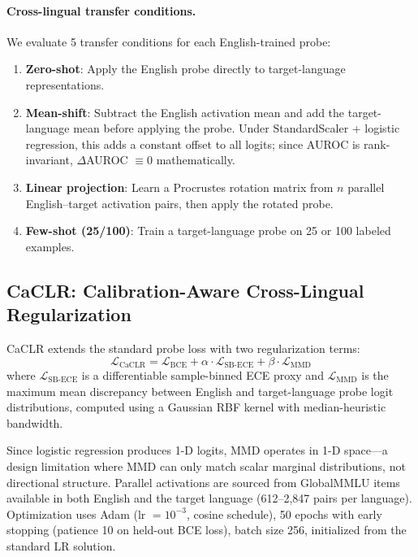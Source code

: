 \documentclass[11pt,a4paper]{article}
\newcommand{\auroc}{AUROC}
\begin{document}
\paragraph{Cross-lingual transfer conditions.}
We evaluate 5 transfer conditions for each English-trained probe:
\begin{enumerate}
    \item \textbf{Zero-shot}: Apply the English probe directly to target-language representations.
    \item \textbf{Mean-shift}: Subtract the English activation mean and add the target-language mean before applying the probe. Under StandardScaler + logistic regression, this adds a constant offset to all logits; since \auroc{} is rank-invariant, $\Delta$\auroc{} $\equiv 0$ mathematically.
    \item \textbf{Linear projection}: Learn a Procrustes rotation matrix from $n$ parallel English--target activation pairs, then apply the rotated probe.
    \item \textbf{Few-shot (25/100)}: Train a target-language probe on 25 or 100 labeled examples.
\end{enumerate}

\subsection{CaCLR: Calibration-Aware Cross-Lingual Regularization}

CaCLR extends the standard probe loss with two regularization terms:
\begin{equation}
    \mathcal{L}_{\text{CaCLR}} = \mathcal{L}_{\text{BCE}} + \alpha \cdot \mathcal{L}_{\text{SB-ECE}} + \beta \cdot \mathcal{L}_{\text{MMD}}
\end{equation}
where $\mathcal{L}_{\text{SB-ECE}}$ is a differentiable sample-binned ECE proxy and $\mathcal{L}_{\text{MMD}}$ is the maximum mean discrepancy between English and target-language probe logit distributions, computed using a Gaussian RBF kernel with median-heuristic bandwidth.

Since logistic regression produces 1-D logits, MMD operates in 1-D space---a design limitation where MMD can only match scalar marginal distributions, not directional structure.
Parallel activations are sourced from GlobalMMLU items available in both English and the target language (612--2,847 pairs per language).
Optimization uses Adam (lr $= 10^{-3}$, cosine schedule), 50 epochs with early stopping (patience 10 on held-out BCE loss), batch size 256, initialized from the standard LR solution.
\end{document}
